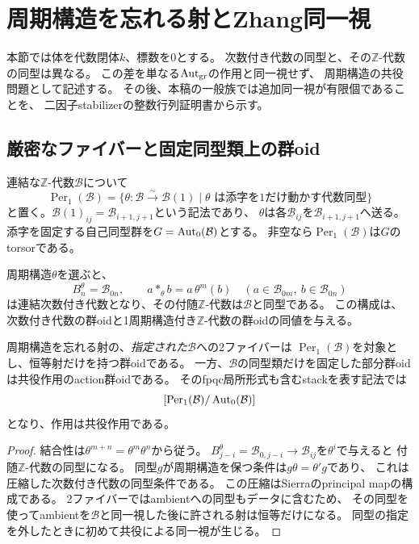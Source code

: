 \section{周期構造を忘れる射とZhang同一視}
\label{sec:period-forgetting}
本節では体を代数閉体$k$、標数を0とする。
次数付き代数の同型と、その$\mathbb Z$-代数の同型は異なる。
この差を単なる$\operatorname{Aut}_{\mathrm{gr}}$の作用と同一視せず、
周期構造の共役問題として記述する。
その後、本稿の一般族では追加同一視が有限個であることを、
二因子stabilizerの整数行列証明書から示す。

\subsection{厳密なファイバーと固定同型類上の群oid}
連結な$\mathbb Z$-代数$\mathcal B$について
\[
 \operatorname{Per}_1(\mathcal B)
 =\{\theta:\mathcal B\xrightarrow{\sim}\mathcal B(1)
       \mid\theta\text{ は添字を1だけ動かす代数同型}\}
\]
と置く。$\mathcal B(1)_{ij}=\mathcal B_{i+1,j+1}$という記法であり、
$\theta$は各$\mathcal B_{ij}$を$\mathcal B_{i+1,j+1}$へ送る。
添字を固定する自己同型群を$G=\operatorname{Aut}_0(\mathcal B)$とする。
非空なら$\operatorname{Per}_1(\mathcal B)$は$G$のtorsorである。

\begin{proposition}[周期構造による圧縮と忘却]\label{prop:period-fiber}
周期構造$\theta$を選ぶと、
\begin{equation}\label{eq:period-compression-product}
 B^\theta_n=\mathcal B_{0n},\qquad
 a*_{\theta}b=a\,\theta^m(b)
 \quad(a\in\mathcal B_{0m},\ b\in\mathcal B_{0n})
\end{equation}
は連結次数付き代数となり、その付随$\mathbb Z$-代数は$\mathcal B$と同型である。
この構成は、次数付き代数の群oidと1周期構造付き$\mathbb Z$-代数の群oidの同値を与える。

周期構造を忘れる射の、\emph{指定された}$\mathcal B$への2ファイバーは
$\operatorname{Per}_1(\mathcal B)$を対象とし、恒等射だけを持つ群oidである。
一方、$\mathcal B$の同型類だけを固定した部分群oidは共役作用のaction群oidである。
そのfpqc局所形式も含むstackを表す記法では
\begin{equation}\label{eq:period-residual-quotient}
 [\operatorname{Per}_1(\mathcal B)/\operatorname{Aut}_0(\mathcal B)]
\end{equation}
となり、作用は共役作用である。
\end{proposition}
\begin{proof}
結合性は$\theta^{m+n}=\theta^m\theta^n$から従う。
$B^\theta_{j-i}=\mathcal B_{0,j-i}\to\mathcal B_{ij}$を$\theta^i$で与えると
付随$\mathbb Z$-代数の同型になる。
同型$g$が周期構造を保つ条件は$g\theta=\theta'g$であり、
これは圧縮した次数付き代数の同型条件である。
この圧縮はSierra\cite[Proposition~3.3]{SierraGAlgebras}のprincipal mapの構成である。
2ファイバーではambientへの同型もデータに含むため、
その同型を使ってambientを$\mathcal B$と同一視した後に許される射は恒等だけになる。
同型の指定を外したときに初めて共役による同一視が生じる。
\end{proof}

